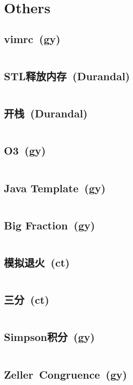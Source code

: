 \chapter{Others}
\section{vimrc\ \small(gy)}
	\inputminted{vim}{Others/.vimrc}
\section{STL释放内存\ \small(Durandal)}
	\inputminted{cpp}{Others/stl_clear.cpp}
\section{开栈\ \small(Durandal)}
	\inputminted{cpp}{Others/rsp.cpp}
\section{O3\ \small(gy)}
	\inputminted{cpp}{Others/o3.cpp}
\section{Java Template\ \small(gy)}
	\inputminted{java}{Others/Template.java}
\section{Big Fraction\ \small(gy)}
	\inputminted{kotlin}{Others/big_fraction.kt}
\section{模拟退火\ \small(ct)}
	\inputminted{cpp}{Others/simulated_annealing.cpp}
\section{三分\ \small(ct)}
	\inputminted{cpp}{Others/cubic_search.cpp}
\section{Simpson积分\ \small(gy)}
	\inputminted{cpp}{Others/simpson.cpp}
\section{Zeller\ Congruence\ \small(gy)}
	\inputminted{cpp}{Others/zeller_congruence.cpp}
